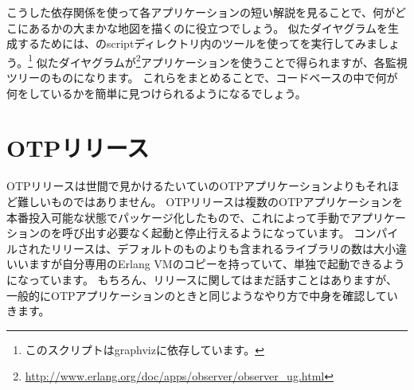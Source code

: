 こうした依存関係を使って各アプリケーションの短い解説を見ることで、何がどこにあるかの大まかな地図を描くのに役立つでしょう。
似たダイヤグラムを生成するためには、のscriptディレクトリ内のツールを使ってを実行してみましょう。\footnote{このスクリプトはgraphvizに依存しています。}
似たダイヤグラムが\footnote{\href{http://www.erlang.org/doc/apps/observer/observer\_ug.html}{http://www.erlang.org/doc/apps/observer/observer\_ug.html}}アプリケーションを使うことで得られますが、各監視ツリーのものになります。
これらをまとめることで、コードベースの中で何が何をしているかを簡単に見つけられるようになるでしょう。

\FloatBarrier

\section{OTPリリース}
\label{sec:dive-otp-releases}

OTPリリースは世間で見かけるたいていのOTPアプリケーションよりもそれほど難しいものではありません。
OTPリリースは複数のOTPアプリケーションを本番投入可能な状態でパッケージ化したもので、これによって手動でアプリケーションのを呼び出す必要なく起動と停止行えるようになっています。
コンパイルされたリリースは、デフォルトのものよりも含まれるライブラリの数は大小違いいますが自分専用のErlang VMのコピーを持っていて、単独で起動できるようになっています。
もちろん、リリースに関してはまだ話すことはありますが、一般的にOTPアプリケーションのときと同じようなやり方で中身を確認していきます。

